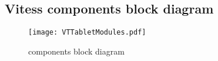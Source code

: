 \subsection{Vitess components block diagram}\hypertarget{vitess-components-block-diagram}{}\label{vitess-components-block-diagram}

\begin{figure}[H]
\caption{components block diagram}
\label{fig:Vitess Spectrum}
\begin{center}
\texttt{[image: VTTabletModules.pdf]}
\end{center}
\end{figure}





